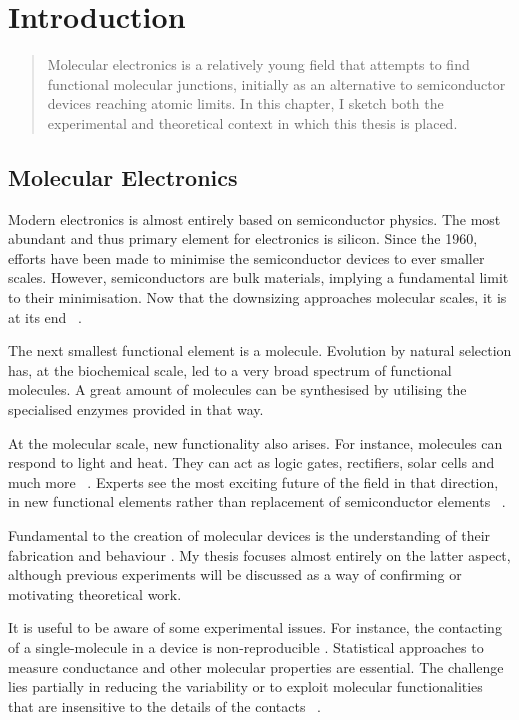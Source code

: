 \chapter{Introduction}
\label{ch:chapter_1}
 
\begin{abstract}
Molecular electronics is a relatively young field that attempts to find functional molecular junctions, initially as an alternative to semiconductor devices reaching atomic limits. In this chapter, I sketch both the experimental and theoretical context in which this thesis is placed.
\end{abstract}

\newpage
\section{Molecular Electronics}
Modern electronics is almost entirely based on semiconductor physics. The most abundant and thus primary element for electronics is silicon. Since the 1960, efforts have been made to minimise the semiconductor devices to ever smaller scales. However, semiconductors are bulk materials, implying a fundamental limit to their minimisation. Now that the downsizing approaches molecular scales, it is at its end ~\cite{seldenthuis}.

The next smallest functional element is a molecule. Evolution by natural selection has, at the biochemical scale, led to a very broad spectrum of functional molecules. A great amount of molecules can be synthesised by utilising the specialised enzymes provided in that way.

At the molecular scale, new functionality also arises. For instance, molecules can respond to light and heat. They can act as logic gates, rectifiers, solar cells and much more ~\cite{perrin}. Experts see the most exciting future of the field in that direction, in new functional elements rather than replacement of semiconductor elements ~\cite{visions}.

Fundamental to the creation of molecular devices is the understanding of their fabrication and behaviour . My thesis focuses almost entirely on the latter aspect, although previous experiments will be discussed as a way of confirming or motivating theoretical work.

It is useful to be aware of some experimental issues. For instance, the contacting of a single-molecule in a device is non-reproducible . Statistical approaches to measure conductance and other molecular properties are essential. The challenge lies partially in reducing the variability or to exploit molecular functionalities that are insensitive to the details of the contacts ~\cite{visions}.

